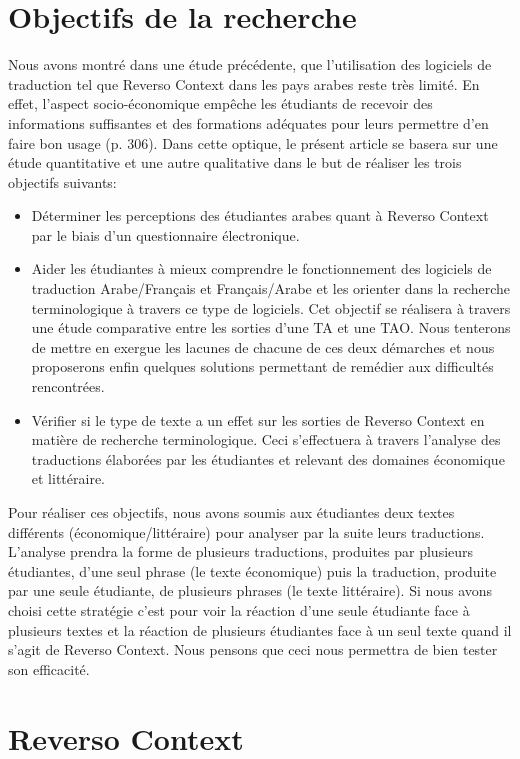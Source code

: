 \documentclass{textolivre}
\begin{document}
\section{Objectifs de la recherche}\label{sec-objetifs}
Nous avons montré dans une étude précédente, \textcite{zemni2020} que l’utilisation des logiciels de traduction tel que Reverso Context dans les pays arabes reste très limité. En effet, l’aspect socio-économique empêche les étudiants de recevoir des informations suffisantes et des formations adéquates pour leurs permettre d’en faire bon usage (p. 306). Dans cette optique, le présent article se basera sur une étude quantitative et une autre qualitative dans le but de réaliser les trois objectifs suivants:
\begin{itemize}
\item Déterminer les perceptions des étudiantes arabes quant à Reverso Context par le biais d’un questionnaire électronique.
\item Aider les étudiantes à mieux comprendre le fonctionnement des logiciels de traduction Arabe/Français et Français/Arabe et les orienter dans la recherche terminologique à travers ce type de logiciels. Cet objectif se réalisera à travers une étude comparative entre les sorties d’une TA et une TAO. Nous tenterons de mettre en exergue les lacunes de chacune de ces deux démarches et nous proposerons enfin quelques solutions permettant de remédier aux difficultés rencontrées.
\item Vérifier si le type de texte a un effet sur les sorties de Reverso Context en matière de recherche terminologique. Ceci s’effectuera à travers l’analyse des traductions élaborées par les étudiantes et relevant des domaines économique et littéraire.
\end{itemize}
Pour réaliser ces objectifs, nous avons soumis aux étudiantes deux textes différents (économique/littéraire) pour analyser par la suite leurs traductions. L’analyse prendra la forme de plusieurs traductions, produites par plusieurs étudiantes, d’une seul phrase (le texte économique) puis la traduction, produite par une seule étudiante, de plusieurs phrases (le texte littéraire). Si nous avons choisi cette stratégie c’est pour voir la réaction d’une seule étudiante face à plusieurs textes et la réaction de plusieurs étudiantes face à un seul texte quand il s’agit de Reverso Context. Nous pensons que ceci nous permettra de bien tester son efficacité.

\section{Reverso  Context}\label{sec-reverso}
\end{document}
